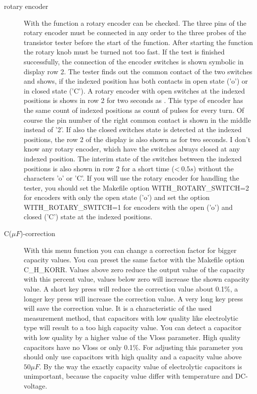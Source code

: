 \begin{description}
\item[rotary encoder]
With the function  a rotary encoder can be checked.
The three pins of the rotary encoder must be connected in any order to the three probes of the transistor tester 
before the start of the function. 
After starting the function the rotary knob must be turned not too fast.
If the test is finished successfully, the connection of the encoder switches  is shown symbolic in display row 2.
The tester finds out the common contact of the two switches and shows, if the indexed position has
both contacts in open state ('o') or in closed state ('C').
A rotary encoder with open switches at the indexed positions is shows in row 2 for two seconds as .
This type of encoder has the same count of indexed positions as count of pulses for every turn. 
Of course the pin number of the right common contact is shown in the middle instead of '2'.
If also the closed switches state is detected at the indexed positions, the row 2 of the display is also
shown as  for two seconds.
I don't know any rotary encoder, which have the switches always closed at any indexed position.
The interim state of the switches between the indexed positions is also shown in row 2 for a short time (\textless\(~0.5s\))
without the characters 'o' or 'C'.
If you will use the rotary encoder for handling the tester, you should set the Makefile option WITH\_ROTARY\_SWITCH=2
for encoders with only the open state ('o') and set the option WITH\_ROTARY\_SWITCH=1 for encoders 
with the open ('o') and closed ('C') state at the indexed positions.\\

\item[C(\(\mu F\))-correction]
With this menu function you can change a correction factor for bigger capacity values.
You can preset the same factor with the Makefile option C\_H\_KORR.
Values above zero reduce the output value of the capacity with this percent value, values below zero will increase
the shown capacity value. A short key press will reduce the correction value about 0.1\%, a longer key press will
increase the correction value. A very long key press will save the correction value.
It is a characteristic of the used measurement method, that capacitors with low quality like electrolytic type will
result to a too high capacity value. You can detect a capacitor with low quality by a higher value of the Vloss parameter.
High quality capacitors have no Vloss or only 0.1\%.
For adjusting this parameter you should only use capacitors with high quality and a capacity value above \(50\mu F\).
By the way the exactly capacity value of electrolytic capacitors is unimportant, because the capacity value differ
with temperature and DC-voltage.


\end{description}
